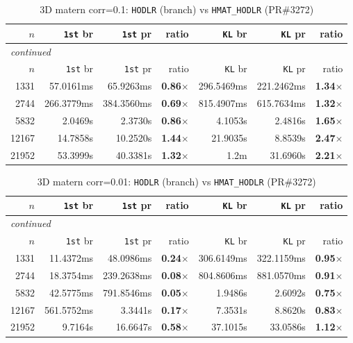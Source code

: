 \documentclass[11pt,a4paper]{article}
\begin{document}
\small\begin{center}
\begin{longtable}{rrrrrrr}
\caption{3D matern corr=0.1: \texttt{HODLR} (branch) vs \texttt{HMAT\_HODLR} (PR\#3272)}
\\\toprule
$n$ & \texttt{1st} br & \texttt{1st} pr & ratio & \texttt{KL} br & \texttt{KL} pr & ratio\\
\midrule
\endfirsthead
\multicolumn{7}{l}{\small\emph{continued}}\\
\toprule
$n$ & \texttt{1st} br & \texttt{1st} pr & ratio & \texttt{KL} br & \texttt{KL} pr & ratio\\
\midrule
\endhead

1331 & 57.0161ms & 65.9263ms & \textbf{0.86$\times$} & 296.5469ms & 221.2462ms & \textbf{1.34$\times$}\\
2744 & 266.3779ms & 384.3560ms & \textbf{0.69$\times$} & 815.4907ms & 615.7634ms & \textbf{1.32$\times$}\\
5832 & 2.0469s & 2.3730s & \textbf{0.86$\times$} & 4.1053s & 2.4816s & \textbf{1.65$\times$}\\
12167 & 14.7858s & 10.2520s & \textbf{1.44$\times$} & 21.9035s & 8.8539s & \textbf{2.47$\times$}\\
21952 & 53.3999s & 40.3381s & \textbf{1.32$\times$} & 1.2m & 31.6960s & \textbf{2.21$\times$}\\
\bottomrule\end{longtable}\end{center}
\small\begin{center}
\begin{longtable}{rrrrrrr}
\caption{3D matern corr=0.01: \texttt{HODLR} (branch) vs \texttt{HMAT\_HODLR} (PR\#3272)}
\\\toprule
$n$ & \texttt{1st} br & \texttt{1st} pr & ratio & \texttt{KL} br & \texttt{KL} pr & ratio\\
\midrule
\endfirsthead
\multicolumn{7}{l}{\small\emph{continued}}\\
\toprule
$n$ & \texttt{1st} br & \texttt{1st} pr & ratio & \texttt{KL} br & \texttt{KL} pr & ratio\\
\midrule
\endhead

1331 & 11.4372ms & 48.0986ms & \textbf{0.24$\times$} & 306.6149ms & 322.1159ms & \textbf{0.95$\times$}\\
2744 & 18.3754ms & 239.2638ms & \textbf{0.08$\times$} & 804.8606ms & 881.0570ms & \textbf{0.91$\times$}\\
5832 & 42.5775ms & 791.8546ms & \textbf{0.05$\times$} & 1.9486s & 2.6092s & \textbf{0.75$\times$}\\
12167 & 561.5752ms & 3.3441s & \textbf{0.17$\times$} & 7.3531s & 8.8620s & \textbf{0.83$\times$}\\
21952 & 9.7164s & 16.6647s & \textbf{0.58$\times$} & 37.1015s & 33.0586s & \textbf{1.12$\times$}\\
\bottomrule\end{longtable}\end{center}
\end{document}
